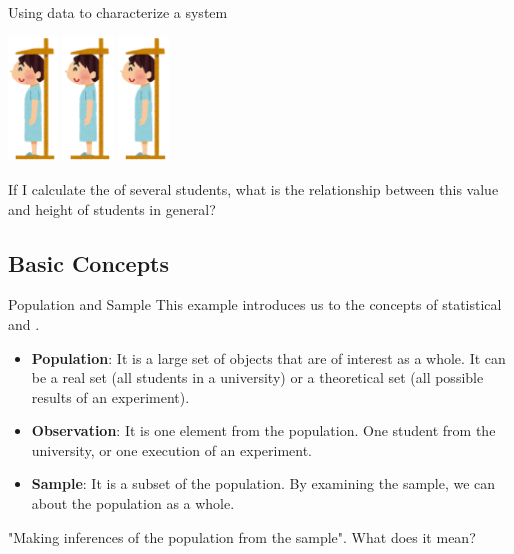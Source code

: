 \begin{frame}{Using data to characterize a system}
\begin{center}
    \includegraphics[width=0.1\textwidth]{../img/irasutoya_height}
    \includegraphics[width=0.1\textwidth]{../img/irasutoya_height}
    \includegraphics[width=0.1\textwidth]{../img/irasutoya_height}
  \end{center}
  \bigskip

  If I calculate the  of several students, what is the relationship between this value and height of students in general?
\end{frame}

\subsection{Basic Concepts}
\begin{frame}{Population and Sample}
  This example introduces us to the concepts of statistical  and .\bigskip

  \begin{itemize}
    \item {\bf Population}: It is a large set of objects that are of interest as a whole. It can be a real set (all students in a university) or a theoretical set (all possible results of an experiment).\medskip

    \item {\bf Observation}: It is one element from the population. One student from the university, or one execution of an experiment.\medskip

    \item {\bf Sample}: It is a subset of the population. By examining the sample, we can  about the population as a whole.
  \end{itemize}
  \bigskip

  "Making inferences of the population from the sample". What does it mean?
\end{frame}

